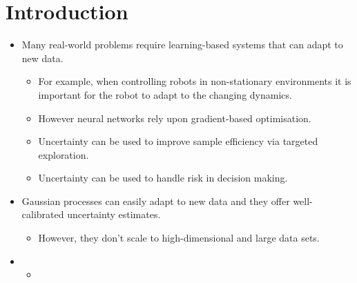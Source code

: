 \documentclass{article}
\begin{document}
\begin{abstract}

\end{abstract}


\section{Introduction} \label{sec:intro}

\begin{itemize}
  \item Many real-world problems require learning-based systems that can adapt to new data.
  \begin{itemize}
    \item For example, when controlling robots in non-stationary environments it is important for the robot to adapt to the changing dynamics.
    \item However neural networks rely upon gradient-based optimisation.
    \item Uncertainty can be used to improve sample efficiency via targeted exploration.
    \item Uncertainty can be used to handle risk in decision making.
  \end{itemize}

  \item Gaussian processes can easily adapt to new data and they offer well-calibrated uncertainty estimates.
  \begin{itemize}
    \item However, they don't scale to high-dimensional and large data sets.
  \end{itemize}
  \item
  \begin{itemize}
    \item
  \end{itemize}
\end{itemize}
\end{document}
